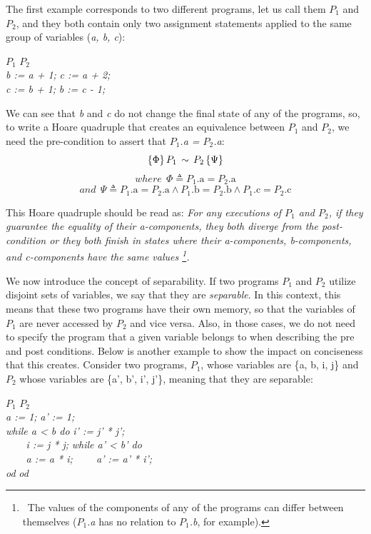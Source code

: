 The first example corresponds to two different programs, let us call them \emph{$P_1$} and \emph{$P_2$}, and they both contain only two assignment statements applied to the same group of variables (\emph{a, b, c}): 
\begin{tabbing}
  \hspace{2cm}\= \emph{$P_1$} \hspace{2cm} \= \emph{$P_2$} \\ 
  \> \emph{b := a + 1;} \> \emph{c := a + 2;} \\
  \> \emph{c := b + 1;} \> \emph{b := c - 1;}
  \label{tabbing:simple_equivalent_program}
\end{tabbing}

We can see that \emph{b} and \emph{c} do not change the final state of any of the programs, so, to write a Hoare quadruple that creates an equivalence between \emph{$P_1$} and \emph{$P_2$}, we need the pre-condition to assert that \emph{$P_1$.a = $P_2$.a}:
\[ \{ \Phi \} \, \emph{$P_1$} \, \sim \, \emph{$P_2$} \, \{ \Psi \} \]
\vspace{-20pt}
\[ where \ \ \Phi \triangleq \text{$P_1$.a} = \text{$P_2$.a} \]
\vspace{-25pt}
\[ and \ \ \Psi \triangleq \text{$P_1$.a} = \text{$P_2$.a} \land \text{$P_1$.b} = \text{$P_2$.b} \land \text{$P_1$.c} = \text{$P_2$.c} \]

This Hoare quadruple should be read as: \emph{For any executions of $P_1$ and $P_2$, if they guarantee the equality of their a-components, they both diverge from the post-condition or they both finish in states where their a-components, b-components, and c-components have the same values
\protect\footnote{\ The values of the components of any of the programs can differ between themselves (\emph{$P_1$.a} has no relation to \emph{$P_1$.b}, for example).}.}

We now introduce the concept of separability.
If two programs \emph{$P_1$} and \emph{$P_2$} utilize disjoint sets of variables, we say that they are \emph{separable}.
In this context, this means that these two programs have their own memory, so that the variables of \emph{$P_1$} are never accessed by \emph{$P_2$} and vice versa.
Also, in those cases, we do not need to specify the program that a given variable belongs to when describing the pre and post conditions.
Below is another example to show the impact on conciseness that this creates.
Consider two programs, \emph{$P_1$}, whose variables are \{{a, b, i, j}\} and \emph{$P_2$} whose variables are \{{a', b', i', j'}\}, meaning that they are separable:
\begin{tabbing}
  \hspace{3cm}\= \emph{$P_1$} \hspace{3cm} \= \emph{$P_2$} \\ 
  \> \emph{a := 1;} \> \emph{a' := 1;} \\
  \> \emph{while a < b do} \> \emph{i' := j' * j';} \\
  \> \emph{\ \ \ \ i := j * j;} \> \emph{while a' < b' do} \\
  \> \emph{\ \ \ \ a := a * i;} \> \emph{\ \ \ \ a' := a' * i';} \\
  \> \emph{od} \> \emph{od} 
\end{tabbing}

